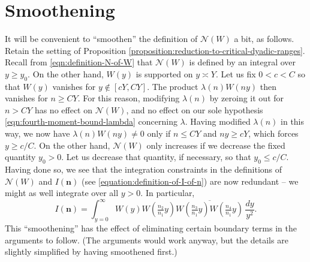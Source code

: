 \documentclass[reqno]{amsart} 
\begin{document}
\section{Smoothening}
It will be convenient to ``smoothen'' the definition of $\mathcal{N}(W)$ a bit, as follows.  Retain the setting of Proposition \ref{proposition:reduction-to-critical-dyadic-ranges}.  Recall from \eqref{eqn:definition-N-of-W} that $\mathcal{N}(W)$ is defined by an integral over $y \geq y_0$.  On the other hand, $W(y)$ is supported on $y \asymp Y$.  Let us fix $0 < c < C$ so that $W(y)$ vanishes for $y \notin [c Y, C Y ]$.  The product $\lambda(n) W(n y)$ then vanishes for $n \geq C Y$.  For this reason, modifying $\lambda(n)$ by zeroing it out for $n > C Y$ has no effect on $\mathcal{N}(W)$, and no effect on our sole hypothesis \eqref{eqn:fourth-moment-bound-lambda} concerning $\lambda$.  Having modified $\lambda(n)$ in this way, we now have $\lambda(n) W(n y) \neq 0$ only if $n \leq C Y$ and $n y \geq c Y$, which forces $y \geq c/C$.  On the other hand, $\mathcal{N}(W)$ only increases if we decrease the fixed quantity $y_0 > 0$.  Let us decrease that quantity, if necessary, so that $y_0 \leq c/C$.  Having done so, we see that the integration constraints in the definitions of $\mathcal{N}(W)$ and $I(\mathbf{n})$ (see \eqref{equation:definition-of-I-of-n}) are now redundant -- we might as well integrate over all $y > 0$.  In particular,
\begin{equation*}
  I(\mathbf{n}) = \int _{y = 0 } ^\infty W (y ) W (\tfrac{n_2}{n _1} y) \overline{W (\tfrac{n _3 }{ n _1 } y) W (\tfrac{n _4}{n_1} y)} \, \frac{d y}{y^2}.
\end{equation*}
This ``smoothening'' has the effect of eliminating certain boundary terms in the arguments to follow.  (The arguments would work anyway, but the details are slightly simplified by having smoothened first.)
\end{document}
